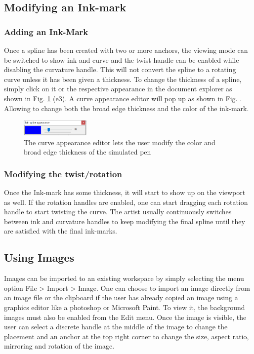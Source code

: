 \subsection{Modifying an Ink-mark}
{
    \subsubsection{Adding an Ink-Mark}
    {
        Once a spline has been created with two or more anchors, the viewing mode can be switched to show ink and curve and the twist handle can be enabled while disabling the curvature handle. This will not convert the spline to a rotating curve unless it has been given a thickness. To change the thickness of a spline, simply click on it or the respective appearance in the document explorer as shown in Fig. \ref{Fig:AppearanceEditor} (e3). A curve appearance editor will pop up as shown in Fig. . Allowing to change both the broad edge thickness and the color of the ink-mark.

        \begin{figure}
          \centering
          \includegraphics[width=0.3\textwidth]{../Images/appearance editor.PNG}
          \caption{The curve appearance editor lets the user modify the color and broad edge thickness of the simulated pen} \label{Fig:AppearanceEditor}
        \end{figure}
    }
    \subsubsection{Modifying the twist/rotation}
    {
        Once the Ink-mark has some thickness, it will start to show up on the viewport as well. If the rotation handles are enabled, one can start dragging each rotation handle to start twisting the curve. The artist usually continuously switches between ink and curvature handles to keep modifying the final spline until they are satisfied with the final ink-marks.
    }
}
\subsection{Using Images}
{
    Images can be imported to an existing workspace by simply selecting the menu option File > Import > Image. One can choose to import an image directly from an image file or the clipboard if the user has already copied an image using a graphics editor like a photoshop or Microsoft Paint. To view it, the background images must also be enabled from the Edit menu. Once the image is visible, the user can select a discrete handle at the middle of the image to change the placement and an anchor at the top right corner to change the size, aspect ratio, mirroring and rotation of the image.
}
